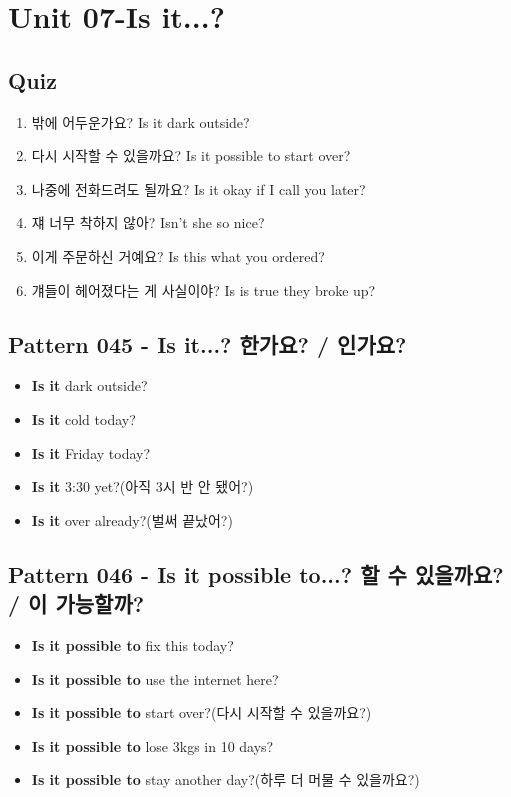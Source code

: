 \documentclass[11pt]{oblivoir}
\begin{document}
\section{Unit 07-Is it...?}
\subsection{Quiz}
\begin{enumerate}
  \color{black} \item 밖에 어두운가요?
    \color{light-gray} Is it dark outside?
  \color{red} \item 다시 시작할 수 있을까요?
    \color{light-gray} Is it possible to start over?
  \color{red} \item 나중에 전화드려도 될까요?
    \color{light-gray} Is it okay if I call you later?
  \color{red} \item 쟤 너무 착하지 않아?
    \color{light-gray} Isn't she so nice?
  \color{red} \item 이게 주문하신 거예요?
    \color{light-gray} Is this what you ordered?
  \color{black} \item 걔들이 헤어졌다는 게 사실이야?
    \color{light-gray} Is is true they broke up?
\end{enumerate}

\subsection{Pattern 045 - Is it...? \texttildelow 한가요? / \texttildelow  인가요?}
\begin{itemize}
  \item \textbf{Is it} dark outside?
  \item \textbf{Is it} cold today?
  \item \textbf{Is it} Friday today?
  \item \textbf{Is it} 3:30 yet?(아직 3시 반 안 됐어?)
  \item \textbf{Is it} over already?(벌써 끝났어?)
\end{itemize}

\subsection{Pattern 046 - Is it possible to...? \texttildelow 할 수 있을까요? / \texttildelow 이 가능할까?}
\begin{itemize}
  \item \textbf{Is it possible to} fix this today?
  \item \textbf{Is it possible to} use the internet here?
  \item \textbf{Is it possible to} start over?(다시 시작할 수 있을까요?)
  \item \textbf{Is it possible to} lose 3kgs in 10 days?
  \item \textbf{Is it possible to} stay another day?(하루 더 머물 수 있을까요?)
\end{itemize}
\end{document}
